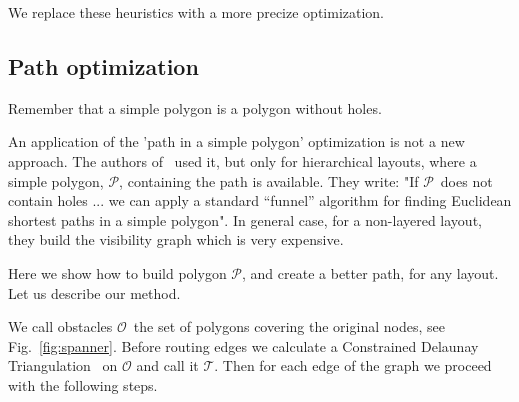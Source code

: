 \documentclass{gd-llncs}
\newcommand{\plg}{$\mathcal{P}$}
\begin{document}
We replace these heuristics with a more precize optimization.
\subsection*{Path optimization} {
Remember that a simple polygon is a polygon without holes.

An application of the 'path in a simple polygon' optimization is not a new approach. The authors of~\cite{dobkin1997implementing} used it, but only for hierarchical layouts, where a simple polygon, \plg, containing the path is available. They write: "If \plg~does not contain holes ... we can apply a standard “funnel” algorithm \cite{chazelle1982theorem,hershberger1994computing} for finding Euclidean shortest paths in a simple polygon". In general case, for a non-layered layout, they build the visibility graph which is very expensive.

Here we show how to build polygon \plg, and create a better path, for any layout. Let us describe our method.

We call obstacles $\mathcal{O}$~the set of polygons covering the original nodes, see Fig.~\ref{fig:spanner}. Before routing edges we calculate a Constrained Delaunay Triangulation~\cite{delaunay1934sphere} on $\mathcal{O}$ and call it $\mathcal{T}$. Then for each edge of the graph we proceed with the following steps.

}
\end{document}
